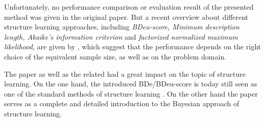 \documentclass{article}
\begin{document}
Unfortunately, no performance comparison or evaluation result of the presented method was given
in the original paper. But a recent overview about different structure learning approaches,
including \textit{BDeu-score, Minimum description length, Akaike's information criterion} and \textit{factorized normalized maximum likelihood}, are given by \cite{Bio}, which
suggest that the performance depends on the right choice of the equivalent sample size, as well as
on the problem domain.

The paper \cite{original} as well as the related \cite{hcg} had a great impact on the topic of structure learning.
On the one hand, the introduced BDe/BDeu-score is today still seen as one of the standard methods of
structure learning \cite{Bio}. On the other hand the paper serves as a complete and detailed introduction
to the Bayesian approach of structure learning.





\end{document}
